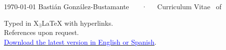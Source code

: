 \documentclass[11pt, a4paper]{bgonzalezbustamante-style}
\begin{document}
\makecvheader

\makecvfooter
  {\today}
  {Bastián González-Bustamante ~~~·~~~Curriculum Vitae}
  {\thepage\ of \pageref*{LastPage}}




















\vspace{10mm}
\raggedleft
{\footnotesize Typed in {\small X$_{\exists}${\LaTeX}} with hyperlinks.}\\
{\footnotesize References upon request.}\\
{\footnotesize \textcolor{oxfordblue}{\normalsize \faGithub} \href{https://bgonzalezbustamante.github.io/CV-XeLaTeX/}{\textcolor{blue}{Download the latest version in English or Spanish}}.}
\end{document}

